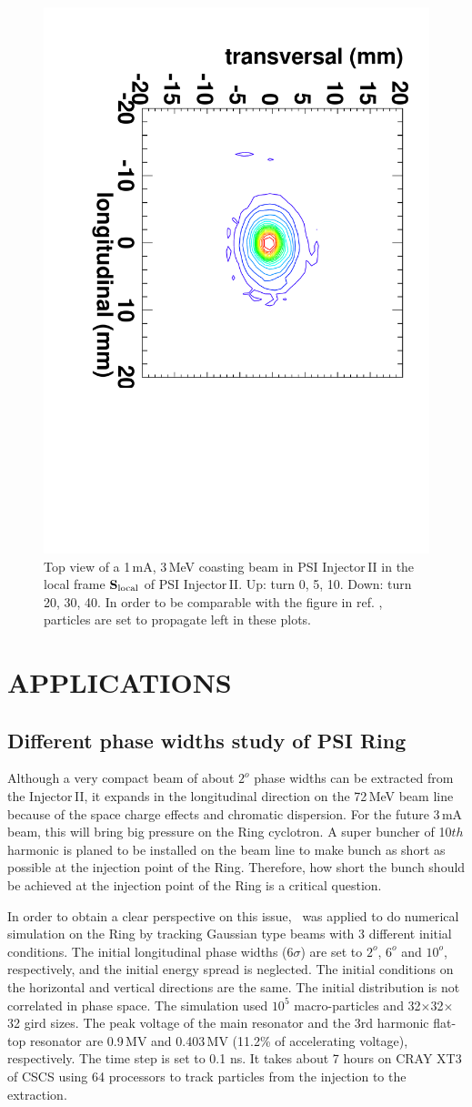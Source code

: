 \documentclass[aps,prstab,twocolumn,superscriptaddress]{revtex4}
\newcommand{\bs}[1]{\mathbf #1}
\begin{document}
\begin{figure}
    \includegraphics[angle=90,width=0.3\linewidth]{figures/Inj2/1mA40.pdf}
    \caption{Top view of a 1\,mA, 3\,MeV coasting beam in PSI Injector\,II in the local frame ${\bs{S}_{\RM{local}}}$ of PSI Injector\,II. 
      Up: turn 0, 5, 10. Down: turn 20, 30, 40. In order to be comparable with the figure in ref. \cite{Adam:3}, particles are set to propagate left 
      in these plots.}
    \label{fig:coasting1mAA}
\end{figure}
\section{APPLICATIONS}

\subsection{Different phase widths study of PSI Ring}

Although a very compact beam of about $2^o$ phase widths can be extracted from the Injector\,II, it expands in the longitudinal direction on the 72\,MeV 
beam line because of the space charge effects and chromatic dispersion. For the future 3\,mA beam, this will bring big pressure on the Ring cyclotron.
A super buncher of 10$th$ harmonic is planed to be installed on the beam line to make bunch as short as possible at the injection point of the Ring.
Therefore, how short the bunch should be achieved at the injection point of the Ring is a critical question. 

In order to obtain a clear perspective on this issue, \opalcycl \  was applied to do numerical simulation on the Ring  by tracking Gaussian type beams with 3
different initial conditions. The initial longitudinal phase widths (6$\sigma$) are set to $2^o$, $6^o$ and $10^o$, respectively,
and the initial energy spread is neglected.
The initial conditions on the horizontal and vertical directions are the same. 
The initial distribution is not correlated in phase space.
The simulation used $10^5$ macro-particles and 32$\times$32$\times$32 gird sizes. The peak voltage of the main resonator and the 3rd harmonic flat-top resonator are 0.9\,MV and
0.403\,MV (11.2\% of accelerating voltage), respectively. The time step is set to 0.1 ns. It takes about 7 hours on CRAY XT3 of CSCS using 64 processors to track particles from the 
injection to the extraction.
\end{document}
